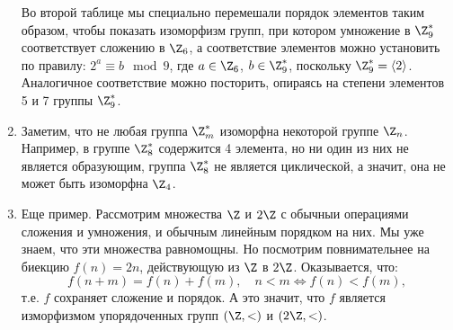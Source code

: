 \begin{enumerate}
Во второй таблице мы специально перемешали порядок элементов таким образом, чтобы показать изоморфизм групп, при котором умножение в $\Z_9^*$ соответствует сложению в $\Z_6$, а соответствие элементов можно установить по правилу: $2^a\equiv b\mod 9$, где $a\in\Z_6$, $b\in\Z_9^*$, поскольку $\Z_9^*=\langle 2\rangle$. Аналогичное соответствие можно посторить, опираясь на степени элементов 5 и 7 группы $\Z_9^*$.

\item Заметим, что не любая группа $\Z_m^*$ изоморфна некоторой группе $\Z_n$. Например, в группе $\Z_8^*$ содержится 4 элемента, но ни один из них не является образующим, группа $\Z_8^*$ не является циклической, а значит, она не может быть изоморфна $\Z_4$.

\item Еще пример. Рассмотрим множества $\Z$ и $2\Z$ с обычныи операциями сложения и умножения, и обычным линейным порядком на них. Мы уже знаем, что эти множества равномощны. Но посмотрим повнимательнее на биекцию $f(n)=2n$, действующую из $\Z$ в $2\Z$. Оказывается, что:
$$
f(n+m)=f(n)+f(m),\quad n<m\Leftrightarrow f(n)<f(m),
$$
т.е. $f$ сохраняет сложение и порядок. А это значит, что $f$ является изморфизмом упорядоченных групп $(\Z,<)$ и $(2\Z,<)$.


\end{enumerate}

